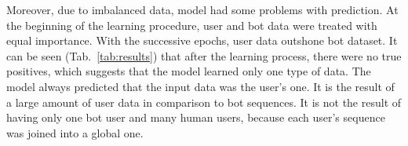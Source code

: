 Moreover, due to imbalanced data, model had some problems with prediction.
At the beginning of the learning procedure, user and bot data were treated with equal importance.
With the successive epochs, user data outshone bot dataset.
It can be seen \mbox{(Tab.~\ref{tab:results})} that after the learning process, there were no true positives, which suggests that the model learned only one type of data.
The model always predicted that the input data was the user's one.
It is the result of a large amount of user data in comparison to bot sequences.
It is not the result of having only one bot user and many human users, because each user's sequence was joined into a global one.\par
